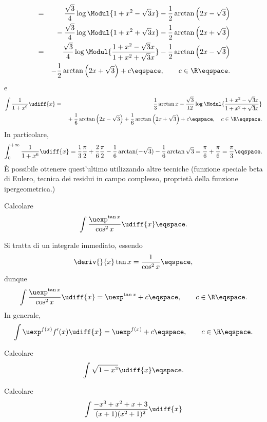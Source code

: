 \begin{Solution}
\begin{eqnarray*}
&=& 
 \frac{\sqrt{3}}{4} \log \Modul{ 1 + x^{2} - \sqrt{3} x } - \frac{1}{2} 
\arctan \left( 2 x - \sqrt{3} \right)  \\
&& {} - \frac{\sqrt{3}}{4} \log \Modul{1+ x^{2} + \sqrt{3} x } - \frac{1}{2} \arctan
\left( 2 x+ \sqrt{3} \right) \\
&=& \frac{\sqrt{3}}{4} \log \Modul{ \frac{ 1 + x^{2} - \sqrt{3} x }{1+x^{2} +
\sqrt{3} x } } - \frac{1}{2} \arctan \left( 2x - \sqrt{3}\right) \\
&& - \frac{1}{2} \arctan \left( 2
x + \sqrt{3} \right) + c \eqspace, \qquad c \in \R \eqspace .
\end{eqnarray*}
e
\begin{eqnarray*}
\int \frac{1}{1+x^{6}} \udiff{x} &=& \frac{1}{3} \arctan x - \frac{\sqrt{3}}{12}
\log \Modul{ \frac{1+x^{2} - \sqrt{3} x }{1+x^{2}  + \sqrt{3} x }} \\
&&{}  + \frac{1}{6} \arctan \left(2 x - \sqrt{3} \right) + \frac{1}{6} \arctan
\left( 2x + \sqrt{3} \right) + c \eqspace , \quad c \in \R \eqspace .
\end{eqnarray*}
In particolare, 
\begin{displaymath}
\int_{0}^{+\infty} \frac{1}{1+x^{6}} \udiff{x} = \frac{1}{3} \frac{\pi}{2} +
\frac{2}{6} \frac{\pi}{2} - \frac{1}{6} \arctan (-\sqrt{3}) - \frac{1}{6}
\arctan \sqrt{3} = \frac{ \pi}{6} + \frac{\pi}{6} = \frac{\pi}{3} \eqspace .
\end{displaymath}
\`E possibile ottenere quest'ultimo utilizzando altre tecniche (funzione
speciale beta di Eulero, tecnica dei residui in campo complesso, propriet\`a
della funzione ipergeometrica.) 
\end{Solution}
\begin{Exercise}
Calcolare
\begin{displaymath}
\int \frac{\uexp^{\tan x }}{\cos^{2} x } \udiff{x} \eqspace .
\end{displaymath}
\end{Exercise}
\begin{Solution}
Si tratta di un integrale immediato, essendo 
\begin{displaymath}
\deriv{}{x} \tan x = \frac{1}{\cos^{2}x} \eqspace,
\end{displaymath}
dunque
\begin{displaymath}
\int \frac{\uexp^{\tan x }}{\cos^{2} x} \udiff{x} = \uexp^{\tan x} + c \eqspace,
\qquad c \in \R \eqspace .
\end{displaymath}
In generale, 
\begin{displaymath}
\int \uexp^{f(x)} f^{\prime}(x) \udiff{x} = \uexp^{f(x)} +  c\eqspace ,\qquad c \in\R
\eqspace .
\end{displaymath}
\end{Solution}
\begin{Exercise}
Calcolare
\begin{displaymath}
\int \sqrt{ 1- x^{2}} \udiff{x} \eqspace .
\end{displaymath}
\end{Exercise}
\begin{Exercise}
Calcolare
\begin{displaymath}
\int \frac{-x^{3} +x^{2} +x  +3}{(x+1) (x^{2}+1) ^{2}} \udiff{x} 
\end{displaymath}
\end{Exercise}





